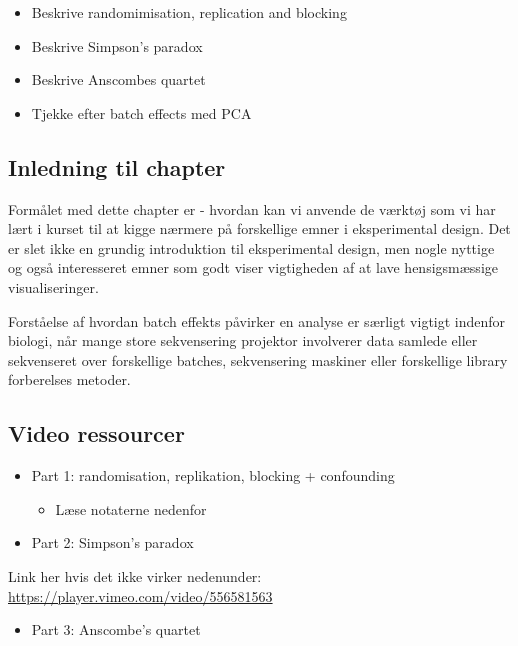 \documentclass[
]{book}
\providecommand{\tightlist}{%
  \setlength{\itemsep}{0pt}\setlength{\parskip}{0pt}}
\begin{document}
\begin{itemize}
\tightlist
\item
  Beskrive randomimisation, replication and blocking
\item
  Beskrive Simpson's paradox
\item
  Beskrive Anscombes quartet
\item
  Tjekke efter batch effects med PCA
\end{itemize}

\hypertarget{inledning-til-chapter-1}{%
\subsection{Inledning til chapter}\label{inledning-til-chapter-1}}

Formålet med dette chapter er - hvordan kan vi anvende de værktøj som vi har lært i kurset til at kigge nærmere på forskellige emner i eksperimental design. Det er slet ikke en grundig introduktion til eksperimental design, men nogle nyttige og også interesseret emner som godt viser vigtigheden af at lave hensigsmæssige visualiseringer.

Forståelse af hvordan batch effekts påvirker en analyse er særligt vigtigt indenfor biologi, når mange store sekvensering projektor involverer data samlede eller sekvenseret over forskellige batches, sekvensering maskiner eller forskellige library forberelses metoder.

\hypertarget{video-ressourcer-7}{%
\subsection{Video ressourcer}\label{video-ressourcer-7}}

\begin{itemize}
\tightlist
\item
  Part 1: randomisation, replikation, blocking + confounding

  \begin{itemize}
  \tightlist
  \item
    Læse notaterne nedenfor
  \end{itemize}
\item
  Part 2: Simpson's paradox
\end{itemize}

Link her hvis det ikke virker nedenunder: \url{https://player.vimeo.com/video/556581563}

\begin{itemize}
\tightlist
\item
  Part 3: Anscombe's quartet
\end{itemize}
\end{document}
